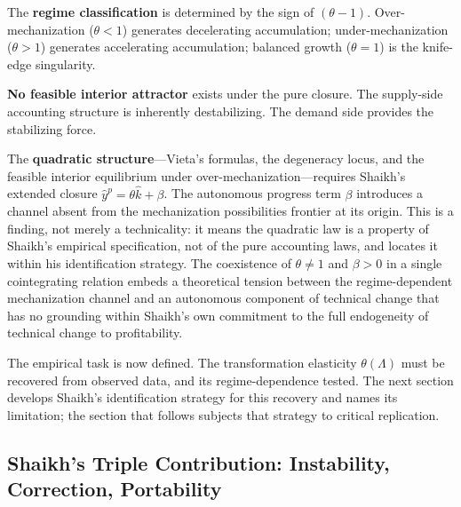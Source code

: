 The \textbf{regime classification} is determined by the sign of $(\theta - 1)$. Over-mechanization ($\theta < 1$) generates decelerating accumulation; under-mechanization ($\theta > 1$) generates accelerating accumulation; balanced growth ($\theta = 1$) is the knife-edge singularity.

\textbf{No feasible interior attractor} exists under the pure closure. The supply-side accounting structure is inherently destabilizing. The demand side provides the stabilizing force.

The \textbf{quadratic structure}---Vieta's formulas, the degeneracy locus, and the feasible interior equilibrium under over-mechanization---requires Shaikh's extended closure $\hat{y}^p = \theta\hat{k} + \beta$. The autonomous progress term $\beta$ introduces a channel absent from the mechanization possibilities frontier at its origin. This is a finding, not merely a technicality: it means the quadratic law is a property of Shaikh's empirical specification, not of the pure accounting laws, and locates it within his identification strategy. The coexistence of $\theta \neq 1$ and $\beta > 0$ in a single cointegrating relation embeds a theoretical tension between the regime-dependent mechanization channel and an autonomous component of technical change that has no grounding within Shaikh's own commitment to the full endogeneity of technical change to profitability.

The empirical task is now defined. The transformation elasticity $\theta(\Lambda)$ must be recovered from observed data, and its regime-dependence tested. The next section develops Shaikh's identification strategy for this recovery and names its limitation; the section that follows subjects that strategy to critical replication.



\subsection{Shaikh's Triple Contribution: Instability, Correction, Portability}
\label{sec:shaikh_triple}


